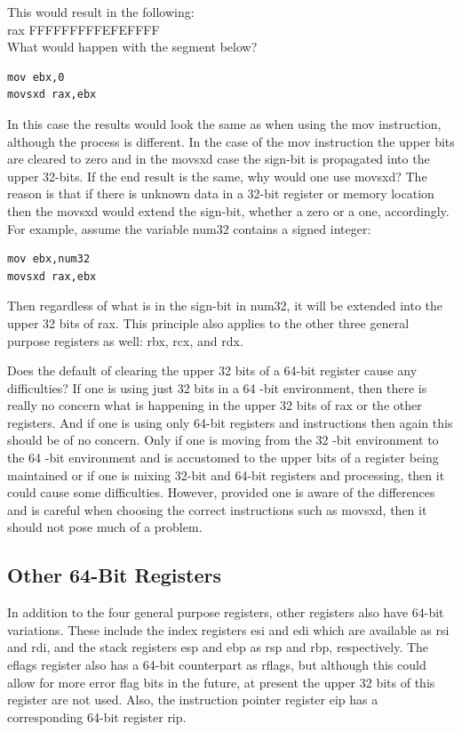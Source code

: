 \documentclass[10pt]{article}
\begin{document}
This would result in the following:\\
rax FFFFFFFFFEFEFFFF\\
What would happen with the segment below?

\begin{verbatim}
mov ebx,0
movsxd rax,ebx
\end{verbatim}

In this case the results would look the same as when using the mov instruction, although the process is different. In the case of the mov instruction the upper bits are cleared to zero and in the movsxd case the sign-bit is propagated into the upper 32-bits. If the end result is the same, why would one use movsxd? The reason is that if there is unknown data in a 32-bit register or memory location then the movsxd would extend the sign-bit, whether a zero or a one, accordingly. For example, assume the variable num32 contains a signed integer:

\begin{verbatim}
mov ebx,num32
movsxd rax,ebx
\end{verbatim}

Then regardless of what is in the sign-bit in num32, it will be extended into the upper 32 bits of rax. This principle also applies to the other three general purpose registers as well: rbx, rcx, and rdx.

Does the default of clearing the upper 32 bits of a 64-bit register cause any difficulties? If one is using just 32 bits in a 64 -bit environment, then there is really no concern what is happening in the upper 32 bits of rax or the other registers. And if one is using only 64-bit registers and instructions then again this should be of no concern. Only if one is moving from the 32 -bit environment to the 64 -bit environment and is accustomed to the upper bits of a register being maintained or if one is mixing 32-bit and 64-bit registers and processing, then it could cause some difficulties. However, provided one is aware of the differences and is careful when choosing the correct instructions such as movsxd, then it should not pose much of a problem.

\subsection*{Other 64-Bit Registers}
In addition to the four general purpose registers, other registers also have 64-bit variations. These include the index registers esi and edi which are available as rsi and rdi, and the stack registers esp and ebp as rsp and rbp, respectively. The eflags register also has a 64-bit counterpart as rflags, but although this could allow for more error flag bits in the future, at present the upper 32 bits of this register are not used. Also, the instruction pointer register eip has a corresponding 64-bit register rip.
\end{document}
